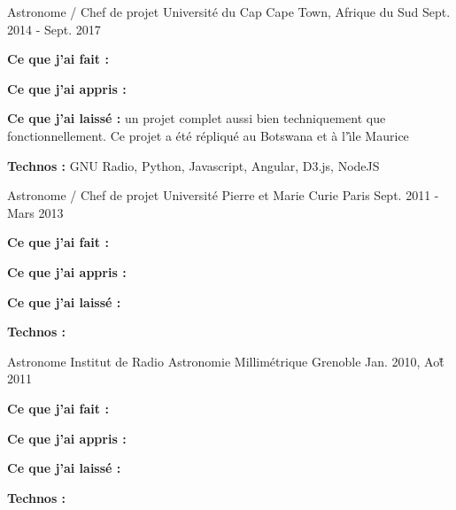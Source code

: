 \begin{cventries}
  \cventry
    {Astronome / Chef de projet} %
    {Université du Cap} %
    {Cape Town, Afrique du Sud} %
    {Sept. 2014 - Sept. 2017} %
    {
      \begin{cvitems} %
        \item {\textbf{Ce que j'ai fait :}}
        \item {\textbf{Ce que j'ai appris :}}
        \item {\textbf{Ce que j'ai laissé :} un projet complet aussi bien techniquement que fonctionnellement. Ce projet a été répliqué au Botswana et à l'\^\i le Maurice}
        \item {\textbf{Technos :} GNU Radio, Python, Javascript, Angular, D3.js, NodeJS}
      \end{cvitems}
    }

  \cventry
    {Astronome / Chef de projet} %
    {Université Pierre et Marie Curie} %
    {Paris} %
    {Sept. 2011 - Mars 2013} %
    {
      \begin{cvitems} %
        \item {\textbf{Ce que j'ai fait :}}
        \item {\textbf{Ce que j'ai appris :}}
        \item {\textbf{Ce que j'ai laissé :}}
        \item {\textbf{Technos :}}
      \end{cvitems}
    }

  \cventry
    {Astronome} %
    {Institut de Radio Astronomie Millimétrique} %
    {Grenoble} %
    {Jan. 2010, Ao\^\u t 2011} %
    {
      \begin{cvitems} %
        \item {\textbf{Ce que j'ai fait :}}
        \item {\textbf{Ce que j'ai appris :}}
        \item {\textbf{Ce que j'ai laissé :}}
        \item {\textbf{Technos :}}
      \end{cvitems}
    }

\end{cventries}

